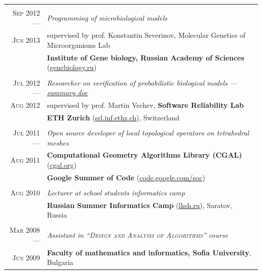 \documentclass[a4paper,10pt]{article}
\def\myline{\color{linegray}\vline}
\begin{document}
{\begin{tabular}{r!{\myline}p{14cm}}
        \\
	\textsc{Sep 2012 ---}      &  \textit{Programming of microbiological models}\\
        \textsc{Jun 2013}  &  supervised by prof. Konstantin Severinov, Molecular Genetics of Microorganisms Lab\\
                                  &  \textbf{Institute of Gene biology, Russian Academy of Sciences} (\href{http://www.genebiology.ru/}{genebiology.ru})\\
	
        \\
	\textsc{Jul 2012 ---}      &  \textit{Researcher on verification of probabilistic biological models --- \href{https://docs.google.com/document/d/1tNkXLaWY3ooA4MEnrbrL2_DOpOaiTlLoFblwzKFZdy0/edit?usp=sharing}{summary doc}}\\
        \textsc{Aug 2012} &  supervised by prof. Martin Vechev, \textbf{Software Reliability Lab}\\
                                  &  \textbf{ETH Zurich} (\href{http://www.srl.inf.ethz.ch/}{srl.inf.ethz.ch}), Switzerland\\
	
        \\
	\textsc{Jul 2011 ---}      &  \textit{Open source developer of local topological operators on tetrahedral meshes}\\
	\textsc{Aug 2011}         &  \textbf{Computational Geometry Algorithms Library (CGAL)} (\href{http://www.cgal.org/}{cgal.org})\\
                                  &  \textbf{Google Summer of Code} (\href{http://code.google.com/soc/}{code.google.com/soc})\\
	
        \\
	\textsc{Aug 2010}         &  \textit{Lecturer at school students informatics camp}\\
	                          &  \textbf{Russian Summer Informatics Camp} (\href{http://lksh.ru/}{lksh.ru}), Saratov, Russia\vspace{-5mm}\\
	
	\\
	\textsc{Mar 2008 ---}      &  \textit{Assistant in \textsc{``Design and Analysis of Algorithms''} course}\\
	\textsc{Jun 2009}        &  \textbf{Faculty of mathematics and informatics, Sofia University}, Bulgaria\\


\end{tabular}}
\end{document}
